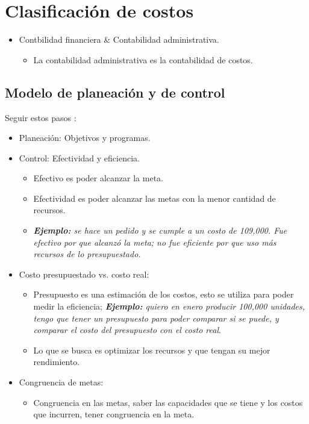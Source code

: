 \section{Clasificación de costos}
\begin{itemize}
    \item Contbilidad financiera \& Contabilidad administrativa.
        \begin{itemize}
            \item La contabilidad administrativa es la contabilidad de costos.
        \end{itemize}
\end{itemize}

\subsection{Modelo de planeación y de control}
Seguir estos pasos :
\begin{itemize}
    \item Planeación: Objetivos y programas.
    \item Control: Efectividad y eficiencia.
        \begin{itemize}
            \item Efectivo es poder alcanzar la meta.
            \item Efectividad es poder alcanzar las metas con la menor cantidad de recursos.
            \item \emph{\textbf{Ejemplo: } se hace un pedido y se cumple a un costo de 109,000. Fue efectivo por que alcanzó la meta; no fue eficiente por que uso más recursos de lo presupuestado.}
        \end{itemize}
    \item Costo presupuestado vs. costo real: 
        \begin{itemize}
            \item Presupuesto es una estimación de los costos, esto se utiliza para poder medir la eficiencia; \emph{\textbf{Ejemplo: }quiero en enero producir 100,000 unidades, tengo que tener un presupuesto para poder comparar si se puede, y comparar el costo del presupuesto con el costo real}.
            \item Lo que se busca es optimizar los recursos y que tengan su mejor rendimiento.
        \end{itemize}
    \item Congruencia de metas:
        \begin{itemize}
            \item Congruencia en las metas, saber las capacidades que se tiene y los costos que incurren, tener congruencia en la meta.
        \end{itemize}
\end{itemize}

